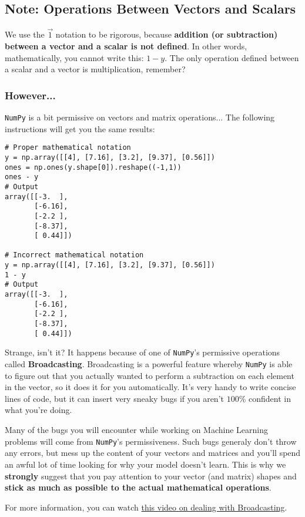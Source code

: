 \subsection*{Note: Operations Between Vectors and Scalars}
We use the $\vec{1}$ notation to be rigorous, because \textbf{addition (or subtraction) between a vector and a scalar is not defined}.
In other words, mathematically, you cannot write this: $1 - y$.
The only operation defined between a scalar and a vector is multiplication, remember?

\subsubsection*{However...}
\texttt{NumPy} is a bit permissive on vectors and matrix operations...
The following instructions will get you the same results:

\begin{verbatim}
# Proper mathematical notation
y = np.array([[4], [7.16], [3.2], [9.37], [0.56]])
ones = np.ones(y.shape[0]).reshape((-1,1))
ones - y
# Output
array([[-3.  ],
       [-6.16],
       [-2.2 ],
       [-8.37],
       [ 0.44]])

# Incorrect mathematical notation
y = np.array([[4], [7.16], [3.2], [9.37], [0.56]])
1 - y
# Output
array([[-3.  ],
       [-6.16],
       [-2.2 ],
       [-8.37],
       [ 0.44]])
\end{verbatim}

Strange, isn't it?
It happens because of one of \texttt{NumPy}'s permissive operations called \textbf{Broadcasting}.
Broadcasting is a powerful feature whereby \texttt{NumPy} is able to figure out that you actually wanted to perform a subtraction on each element in the vector, so it does it for you automatically.
It's very handy to write concise lines of code, but it can insert very sneaky bugs if you aren't $100$\% confident in what you're doing.


Many of the bugs you will encounter while working on Machine Learning problems will come from \texttt{NumPy}'s permissiveness.
Such bugs generaly don't throw any errors, but mess up the content of your vectors and matrices and you'll spend an awful lot of time looking for why your model doesn't learn.
This is why we \textbf{strongly} suggest that you pay attention to your vector (and matrix) shapes and \textbf{stick as much as possible to the actual mathematical operations}.

For more information, you can watch \href{https://www.youtube.com/watch?v=V2QlTmh6P2Y&t=213s}{this video on dealing with Broadcasting}.
